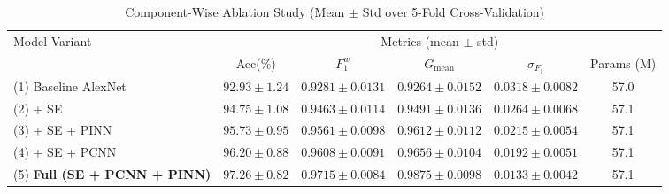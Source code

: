 \documentclass[twocolumn,iicol,pdflatex,sn-mathphys-num]{sn-jnl}%
\begin{document}
\begin{table}
	\centering
	\begin{minipage}{\textheight}
	\centering
	\caption{Component-Wise Ablation Study (Mean $\pm$ Std over 5-Fold Cross-Validation)}
	\label{tab6}
	\begin{tabular*}{\textheight}{@{\extracolsep\fill}l c c c c c}
		\toprule
		\multirow{2}{*}{Model Variant} & \multicolumn{5}{c}{Metrics (mean $\pm$ std)} \\
		\cmidrule(lr){2-6}
		& Acc(\%) & $F_1^w$ & $G_{\text{mean}}$ & $\sigma_{F_1}$ & Params (M) \\
		\midrule
		(1) Baseline AlexNet           & $92.93 \pm 1.24$ & $0.9281 \pm 0.0131$ & $0.9264 \pm 0.0152$ & $0.0318 \pm 0.0082$ & 57.0 \\
		(2) + SE                       & $94.75 \pm 1.08$ & $0.9463 \pm 0.0114$ & $0.9491 \pm 0.0136$ & $0.0264 \pm 0.0068$ & 57.1 \\
		(3) + SE + PINN                & $95.73 \pm 0.95$ & $0.9561 \pm 0.0098$ & $0.9612 \pm 0.0112$ & $0.0215 \pm 0.0054$ & 57.1 \\
		(4) + SE + PCNN                & $96.20 \pm 0.88$ & $0.9608 \pm 0.0091$ & $0.9656 \pm 0.0104$ & $0.0192 \pm 0.0051$ & 57.1 \\
		(5) \textbf{Full (SE + PCNN + PINN)} & $\bm{97.26 \pm 0.82}$ & $\bm{0.9715 \pm 0.0084}$ & $\bm{0.9875 \pm 0.0098}$ & $\bm{0.0133 \pm 0.0042}$ & 57.1 \\
		\bottomrule
	\end{tabular*}
	\end{minipage}
	
	\bigskip\bigskip
	

\end{table}
\end{document}
